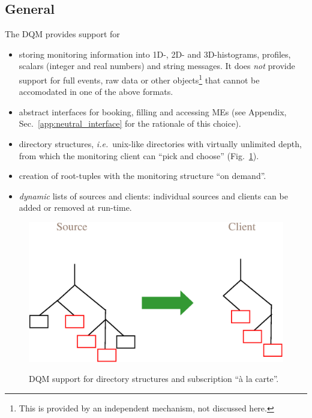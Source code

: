 \documentclass{cmspaper}
\newcommand {\ie}{\mbox{\sl i.e. }}     %
\begin{document}
\subsection{General}
\label{sec:req_general}
The DQM provides support for 
\begin{itemize}
\item{storing monitoring information into 1D-, 2D- and 3D-histograms,
profiles, scalars (integer and real numbers) and string messages. It
does \emph{not} provide support for full events, raw data or other
objects\footnote{This is provided by an independent mechanism, not
discussed here.} that cannot be accomodated in one of the above formats.} 
\item{abstract interfaces for booking, filling and accessing MEs (see
Appendix, Sec.~\ref{app:neutral_interface} for the rationale of this
choice).} 
\item{directory structures, \ie unix-like directories with
virtually unlimited depth, from which the monitoring client can ``pick
and choose'' (Fig.~\ref{fig:dir_structure_support}). }
\item{creation of root-tuples with the monitoring structure ``on demand''.}
\item{\emph{dynamic} lists of sources and clients: individual sources and
clients can be added or removed at run-time.} 
\end{itemize}
%
\begin{figure}[hbtp]
  \begin{center}
    \resizebox{10cm}{!}
	{\includegraphics{figures/dir_structure_support.eps}} 
\caption{DQM support for directory structures and subscription ``\`a
la carte''.}
\label{fig:dir_structure_support}
  \end{center}
\end{figure}
%
%
\end{document}

